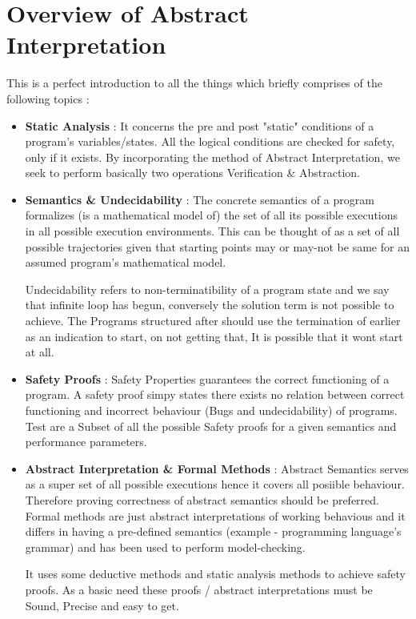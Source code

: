 \chapter{Overview of Abstract Interpretation}

This is a perfect introduction to all the things which briefly comprises of the following topics :


\begin{itemize}
	\item{\textbf{Static Analysis} : 
	It concerns the pre and post "static" conditions of a program's variables/states. All the logical conditions are checked for safety, only if it exists. By incorporating the method of Abstract Interpretation, we seek to perform basically two operations \- Verification \& Abstraction.
	}
	\item{\textbf{Semantics \& Undecidability} : 
	The concrete semantics of a program formalizes (is a mathematical model of) the set of all its possible executions in all possible execution environments. This can be thought of as a set of all possible trajectories given that starting points may or may-not be same for an assumed program's mathematical model.

	Undecidability refers to non-terminatibility of a program state and we say that infinite loop has begun, conversely the solution term is not possible to achieve. The Programs structured after should use the termination of earlier as an indication to start, on not getting that, It is possible that it wont start at all.	
	}

	\item{\textbf{Safety Proofs} : 
	Safety Properties guarantees the correct functioning of a program. A safety proof simpy states there exists no relation between correct functioning and incorrect behaviour (Bugs and undecidability) of programs. Test are a Subset of all the possible Safety proofs for a given semantics and performance parameters.
	}

	\item{\textbf{Abstract Interpretation \& Formal Methods} :
	Abstract Semantics serves as a super set of all possible executions hence it covers all posiible behaviour. Therefore proving correctness of abstract semantics should be preferred. Formal methods are just abstract interpretations of working behavious and it differs in having a pre-defined semantics (example - programming language's grammar) and has been used to perform model-checking. 

	It uses some deductive methods and static analysis methods to achieve safety proofs.
	As a basic need these proofs / abstract interpretations must be Sound, Precise and easy to get.

}
\end{itemize}
